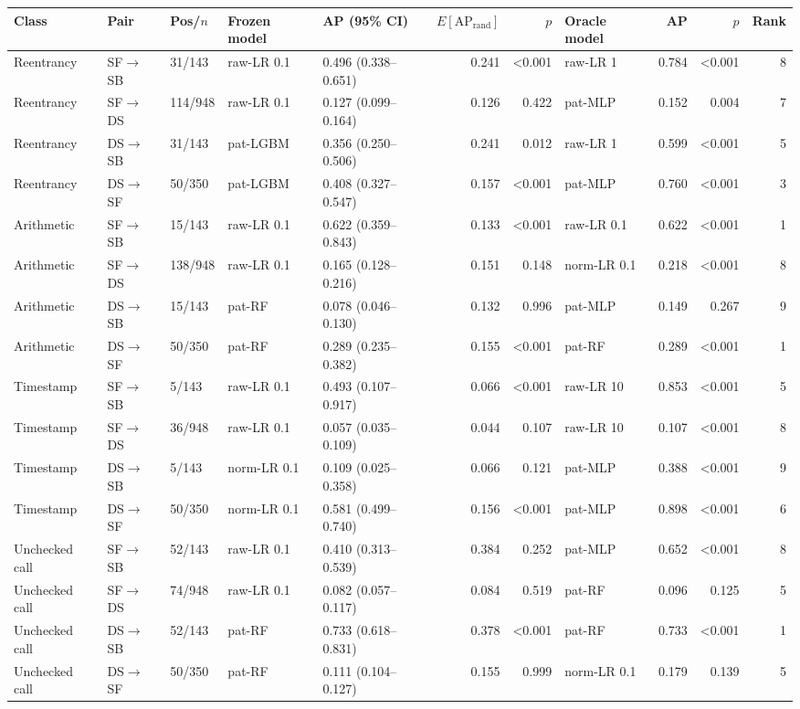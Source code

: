 \begin{tabular}{@{}lllllrrlrrr@{}}
\toprule
Class & Pair & Pos/$n$ & Frozen model & AP (95\% CI) & $E[\mathrm{AP}_{\mathrm{rand}}]$ & $p$ & Oracle model & AP & $p$ & Rank\\
\midrule
Reentrancy & SF$\rightarrow$SB & 31/143 & raw-LR 0.1 & 0.496 (0.338--0.651) & 0.241 & <0.001 & raw-LR 1 & 0.784 & <0.001 & 8\\
Reentrancy & SF$\rightarrow$DS & 114/948 & raw-LR 0.1 & 0.127 (0.099--0.164) & 0.126 & 0.422 & pat-MLP & 0.152 & 0.004 & 7\\
Reentrancy & DS$\rightarrow$SB & 31/143 & pat-LGBM & 0.356 (0.250--0.506) & 0.241 & 0.012 & raw-LR 1 & 0.599 & <0.001 & 5\\
Reentrancy & DS$\rightarrow$SF & 50/350 & pat-LGBM & 0.408 (0.327--0.547) & 0.157 & <0.001 & pat-MLP & 0.760 & <0.001 & 3\\
Arithmetic & SF$\rightarrow$SB & 15/143 & raw-LR 0.1 & 0.622 (0.359--0.843) & 0.133 & <0.001 & raw-LR 0.1 & 0.622 & <0.001 & 1\\
Arithmetic & SF$\rightarrow$DS & 138/948 & raw-LR 0.1 & 0.165 (0.128--0.216) & 0.151 & 0.148 & norm-LR 0.1 & 0.218 & <0.001 & 8\\
Arithmetic & DS$\rightarrow$SB & 15/143 & pat-RF & 0.078 (0.046--0.130) & 0.132 & 0.996 & pat-MLP & 0.149 & 0.267 & 9\\
Arithmetic & DS$\rightarrow$SF & 50/350 & pat-RF & 0.289 (0.235--0.382) & 0.155 & <0.001 & pat-RF & 0.289 & <0.001 & 1\\
Timestamp & SF$\rightarrow$SB & 5/143 & raw-LR 0.1 & 0.493 (0.107--0.917) & 0.066 & <0.001 & raw-LR 10 & 0.853 & <0.001 & 5\\
Timestamp & SF$\rightarrow$DS & 36/948 & raw-LR 0.1 & 0.057 (0.035--0.109) & 0.044 & 0.107 & raw-LR 10 & 0.107 & <0.001 & 8\\
Timestamp & DS$\rightarrow$SB & 5/143 & norm-LR 0.1 & 0.109 (0.025--0.358) & 0.066 & 0.121 & pat-MLP & 0.388 & <0.001 & 9\\
Timestamp & DS$\rightarrow$SF & 50/350 & norm-LR 0.1 & 0.581 (0.499--0.740) & 0.156 & <0.001 & pat-MLP & 0.898 & <0.001 & 6\\
Unchecked call & SF$\rightarrow$SB & 52/143 & raw-LR 0.1 & 0.410 (0.313--0.539) & 0.384 & 0.252 & pat-MLP & 0.652 & <0.001 & 8\\
Unchecked call & SF$\rightarrow$DS & 74/948 & raw-LR 0.1 & 0.082 (0.057--0.117) & 0.084 & 0.519 & pat-RF & 0.096 & 0.125 & 5\\
Unchecked call & DS$\rightarrow$SB & 52/143 & pat-RF & 0.733 (0.618--0.831) & 0.378 & <0.001 & pat-RF & 0.733 & <0.001 & 1\\
Unchecked call & DS$\rightarrow$SF & 50/350 & pat-RF & 0.111 (0.104--0.127) & 0.155 & 0.999 & norm-LR 0.1 & 0.179 & 0.139 & 5\\
\bottomrule
\end{tabular}
